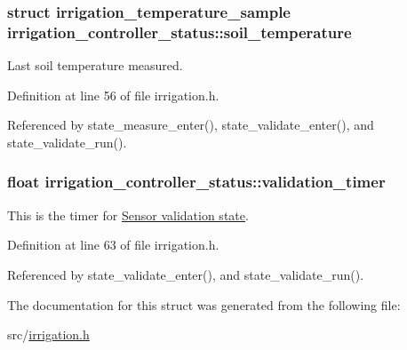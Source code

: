 \hypertarget{structirrigation__controller__status_a3ef3b031a2c91413170ad02626e8da1c}{}
\subsubsection[{soil\+\_\+temperature}]{\setlength{\rightskip}{0pt plus 5cm}struct {\bf irrigation\+\_\+temperature\+\_\+sample} irrigation\+\_\+controller\+\_\+status\+::soil\+\_\+temperature}\label{structirrigation__controller__status_a3ef3b031a2c91413170ad02626e8da1c}


Last soil temperature measured. 



Definition at line 56 of file irrigation.\+h.



Referenced by state\+\_\+measure\+\_\+enter(), state\+\_\+validate\+\_\+enter(), and state\+\_\+validate\+\_\+run().

\hypertarget{structirrigation__controller__status_a360e7ee7f6ac54635fc66035883d2d9c}{}
\subsubsection[{validation\+\_\+timer}]{\setlength{\rightskip}{0pt plus 5cm}float irrigation\+\_\+controller\+\_\+status\+::validation\+\_\+timer}\label{structirrigation__controller__status_a360e7ee7f6ac54635fc66035883d2d9c}


This is the timer for \hyperlink{group__state__validate}{Sensor validation state}. 



Definition at line 63 of file irrigation.\+h.



Referenced by state\+\_\+validate\+\_\+enter(), and state\+\_\+validate\+\_\+run().



The documentation for this struct was generated from the following file\+:\begin{DoxyCompactItemize}
\item 
src/\hyperlink{irrigation_8h}{irrigation.\+h}\end{DoxyCompactItemize}
